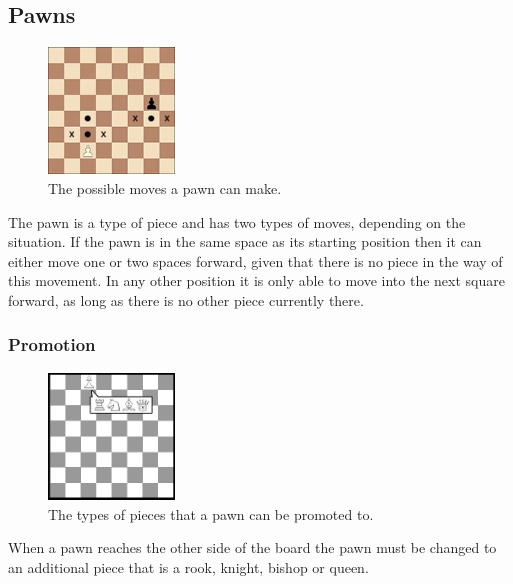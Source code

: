 \documentclass[twoside, 12pt]{report}
\begin{document}
\subsection{Pawns}
\begin{figure}[H]
\centering
	\includegraphics[width=0.3\textwidth]{images/boards/pawn_movement}
	\caption{The possible moves a pawn can make.}
\end{figure}
The pawn is a type of piece and has two types of moves, depending on the situation. If the pawn is in the same space as its starting position then it can either move one or two spaces forward, given that there is no piece in the way of this movement. In any other position it is only able to move into the next square forward, as long as there is no other piece currently there. 
\subsubsection{Promotion}
\begin{figure}[H]
\centering
	\includegraphics[width=0.3\textwidth]{images/boards/promotion}
	\caption{The types of pieces that a pawn can be promoted to.}
\end{figure}
When a pawn reaches the other side of the board the pawn must be changed to an additional piece that is a rook, knight, bishop or queen.
\end{document}
